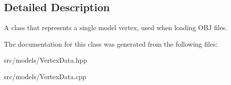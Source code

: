 \subsection{Detailed Description}
A class that represents a single model vertex, used when loading O\+BJ files. 



The documentation for this class was generated from the following files\+:\begin{DoxyCompactItemize}
\item 
src/models/Vertex\+Data.\+hpp\item 
src/models/Vertex\+Data.\+cpp\end{DoxyCompactItemize}
